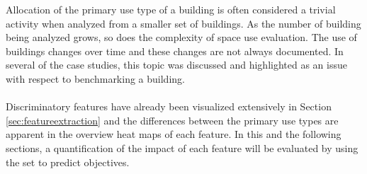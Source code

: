 Allocation of the primary use type of a building is often considered a trivial activity when analyzed from a smaller set of buildings. As the number of building being analyzed grows, so does the complexity of space use evaluation. The use of buildings changes over time and these changes are not always documented. In several of the case studies, this topic was discussed and highlighted as an issue with respect to benchmarking a building.\\
\\
Discriminatory features have already been visualized extensively in Section \ref{sec:featureextraction} and the differences between the primary use types are apparent in the overview heat maps of each feature. In this and the following sections, a quantification of the impact of each feature will be evaluated by using the set to predict objectives.